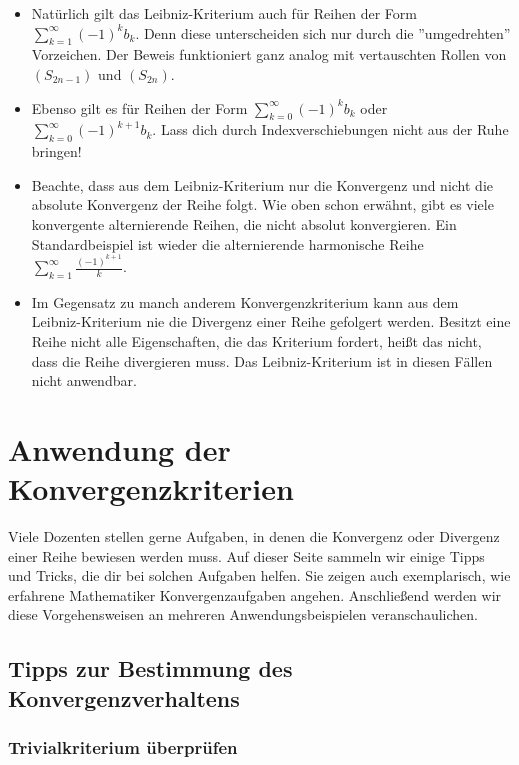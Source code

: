 \documentclass[fontsize=9pt,
               parskip=half-,
               DIV=14,
               listof=chapterentry,
               tocflat]{scrbook}
\begin{document}
\begin{itemize}
\item Natürlich gilt das Leibniz-Kriterium auch für Reihen der Form $\sum _{k=1}^{\infty }(-1)^{k}b_{k}$. Denn diese unterscheiden sich nur durch die {''}umgedrehten{''} Vorzeichen. Der Beweis funktioniert ganz analog mit vertauschten Rollen von $(S_{2n-1})$ und $(S_{2n})$.
\item Ebenso gilt es für Reihen der Form $\sum _{k=0}^{\infty }(-1)^{k}b_{k}$ oder $\sum _{k=0}^{\infty }(-1)^{k+1}b_{k}$. Lass dich durch Indexverschiebungen nicht aus der Ruhe bringen!
\item Beachte, dass aus dem Leibniz-Kriterium nur die Konvergenz und nicht die absolute Konvergenz der Reihe folgt. Wie oben schon erwähnt, gibt es viele konvergente alternierende Reihen, die nicht absolut konvergieren. Ein Standardbeispiel ist wieder die alternierende harmonische Reihe $\sum _{k=1}^{\infty }{\frac {(-1)^{k+1}}{k}}$.
\item Im Gegensatz zu manch anderem Konvergenzkriterium kann aus dem Leibniz-Kriterium nie die Divergenz einer Reihe gefolgert werden. Besitzt eine Reihe nicht alle Eigenschaften, die das Kriterium fordert, heißt das nicht, dass die Reihe divergieren muss. Das Leibniz-Kriterium ist in diesen Fällen nicht anwendbar. 
\end{itemize}

\chapter{Anwendung der Konvergenzkriterien}

Viele Dozenten stellen gerne Aufgaben, in denen die Konvergenz oder Divergenz einer Reihe bewiesen werden muss. Auf dieser Seite sammeln wir einige Tipps und Tricks, die dir bei solchen Aufgaben helfen. Sie zeigen auch exemplarisch, wie erfahrene Mathematiker Konvergenzaufgaben angehen. Anschließend werden wir diese Vorgehensweisen an mehreren Anwendungsbeispielen veranschaulichen.

\section{Tipps zur Bestimmung des Konvergenzverhaltens}

\subsection{Trivialkriterium überprüfen}
\end{document}
